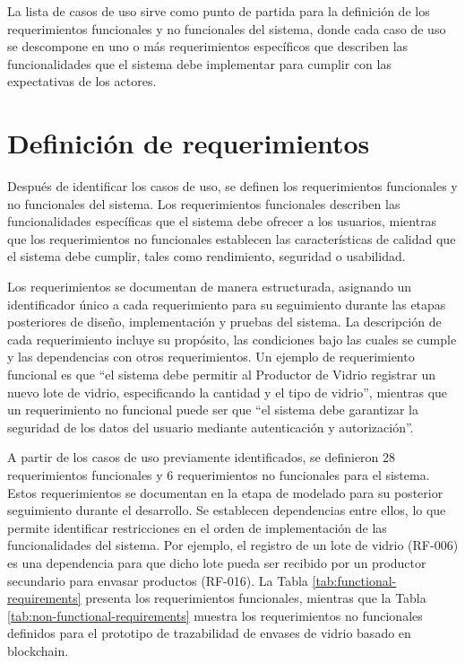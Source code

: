 La lista de casos de uso sirve como punto de partida para la definición de los requerimientos funcionales y no funcionales del sistema, donde cada caso de uso se descompone en uno o más requerimientos específicos que describen las funcionalidades que el sistema debe implementar para cumplir con las expectativas de los actores.

\section{Definición de requerimientos}
\label{sec:requirements-definition}

Después de identificar los casos de uso, se definen los requerimientos funcionales y no funcionales del sistema. Los requerimientos funcionales describen las funcionalidades específicas que el sistema debe ofrecer a los usuarios, mientras que los requerimientos no funcionales establecen las características de calidad que el sistema debe cumplir, tales como rendimiento, seguridad o usabilidad.

Los requerimientos se documentan de manera estructurada, asignando un identificador único a cada requerimiento para su seguimiento durante las etapas posteriores de diseño, implementación y pruebas del sistema. La descripción de cada requerimiento incluye su propósito, las condiciones bajo las cuales se cumple y las dependencias con otros requerimientos. Un ejemplo de requerimiento funcional es que ``el sistema debe permitir al Productor de Vidrio registrar un nuevo lote de vidrio, especificando la cantidad y el tipo de vidrio'', mientras que un requerimiento no funcional puede ser que ``el sistema debe garantizar la seguridad de los datos del usuario mediante autenticación y autorización''.

A partir de los casos de uso previamente identificados, se definieron 28 requerimientos funcionales y 6 requerimientos no funcionales para el sistema. Estos requerimientos se documentan en la etapa de modelado para su posterior seguimiento durante el desarrollo. Se establecen dependencias entre ellos, lo que permite identificar restricciones en el orden de implementación de las funcionalidades del sistema. Por ejemplo, el registro de un lote de vidrio (RF-006) es una dependencia para que dicho lote pueda ser recibido por un productor secundario para envasar productos (RF-016). La Tabla \ref{tab:functional-requirements} presenta los requerimientos funcionales, mientras que la Tabla \ref{tab:non-functional-requirements} muestra los requerimientos no funcionales definidos para el prototipo de trazabilidad de envases de vidrio basado en blockchain.

